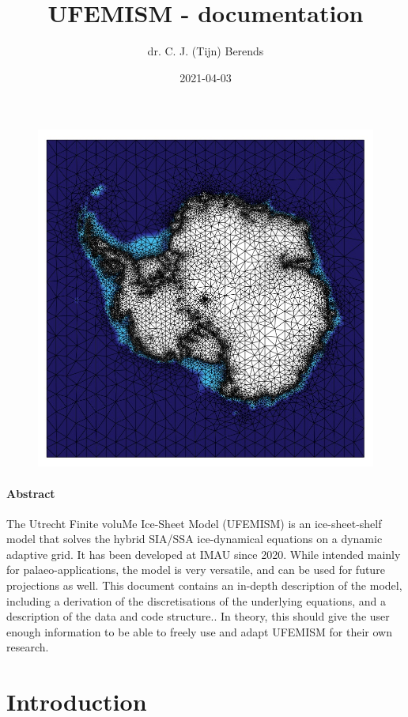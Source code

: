 \documentclass{article}
\title{UFEMISM - documentation}
\date{2021-04-03}
\author{dr. C. J. (Tijn) Berends}
\begin{document}
  \maketitle

  \begin{figure}[H]
    \centering
    \includegraphics[width=0.8\linewidth]{Fig_UFEMISM.jpg}
  \end{figure}  

  \paragraph{Abstract}
  
The Utrecht Finite voluMe Ice-Sheet Model (UFEMISM) is an ice-sheet-shelf model that solves the hybrid SIA/SSA ice-dynamical equations on a dynamic adaptive grid. It has been developed at IMAU since 2020. While intended mainly for palaeo-applications, the model is very versatile, and can be used for future projections as well. This document contains an in-depth description of the model, including a derivation of the discretisations of  the underlying equations, and a description of the data and code structure.. In theory, this should give the user enough information to be able to freely use and adapt UFEMISM for their own research.
  
\newpage
\tableofcontents

\newpage
{}

\section{Introduction}
\end{document}
